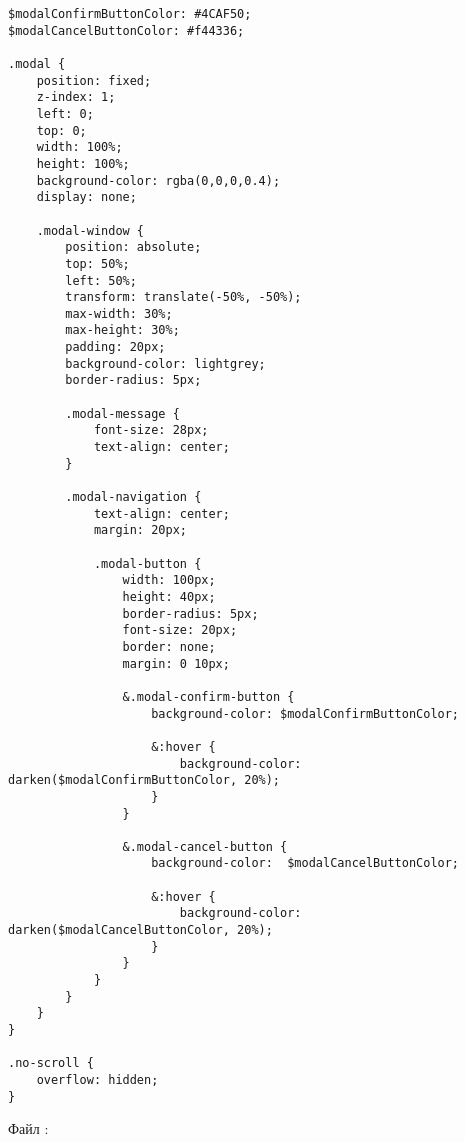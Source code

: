\documentclass[a4paper,14pt]{extarticle}
\begin{document}
\begin{lstlisting}
$modalConfirmButtonColor: #4CAF50;
$modalCancelButtonColor: #f44336;

.modal {
    position: fixed;
    z-index: 1;
    left: 0;
    top: 0;
    width: 100%;
    height: 100%;
    background-color: rgba(0,0,0,0.4);
    display: none;

    .modal-window {
        position: absolute;
        top: 50%;
        left: 50%;
        transform: translate(-50%, -50%);
        max-width: 30%;
        max-height: 30%;
        padding: 20px;
        background-color: lightgrey;
        border-radius: 5px;

        .modal-message {
            font-size: 28px;
            text-align: center;
        }

        .modal-navigation {
            text-align: center;
            margin: 20px;

            .modal-button {
                width: 100px;
                height: 40px;
                border-radius: 5px;
                font-size: 20px;
                border: none;
                margin: 0 10px;

                &.modal-confirm-button {
                    background-color: $modalConfirmButtonColor;

                    &:hover {
                        background-color: darken($modalConfirmButtonColor, 20%);
                    }
                }

                &.modal-cancel-button {
                    background-color:  $modalCancelButtonColor;

                    &:hover {
                        background-color: darken($modalCancelButtonColor, 20%);
                    }
                }
            }
        }
    }
}

.no-scroll {
    overflow: hidden;
}
\end{lstlisting}

Файл :
\end{document}
